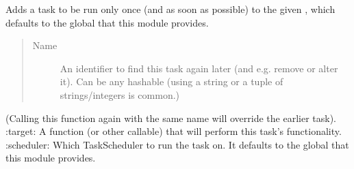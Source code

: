 \documentclass[letterpaper,10pt,english]{sphinxmanual}
\begin{document}
%
\begin{sphinxVerbatim}[commandchars=\\\{\}]
   
  
  
  
  
\end{sphinxVerbatim}

\begin{fulllineitems}
\label{\detokenize{periodic_tasks:periodic_tasks.add_background_task}}
Adds a task to be run only once (and as soon as possible) to the given , which defaults to the global  that this module provides.
\begin{quote}\begin{description}
\item[{Name}] \leavevmode
An identifier to find this task again later (and e.g. remove or alter it). Can be any hashable (using a string or a tuple of strings/integers is common.)

\end{description}\end{quote}

(Calling this function again with the same name will override the earlier task).
:target: A function (or other callable) that will perform this task’s functionality.
:scheduler: Which TaskScheduler to run the task on. It defaults to the global  that this module provides.

\end{fulllineitems}
\end{document}
